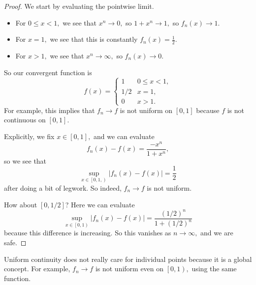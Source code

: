 \begin{proof}
	We start by evaluating the pointwise limit.
	\begin{itemize}
		\item For $0\le x<1,$ we see that $x^n\to0,$ so $1+x^n\to1,$ so $f_n(x)\to 1.$
		\item For $x=1,$ we see that this is constantly $f_n(x)=\frac12.$
		\item For $x>1,$ we see that $x^n\to\infty,$ so $f_n(x)\to0.$
	\end{itemize}
	So our convergent function is
	\[f(x)=\begin{cases}
		1 & 0\le x<1, \\
		1/2 & x=1, \\
		0 & x>1.
	\end{cases}\]
	For example, this implies that $f_n\to f$ is not uniform on $[0,1]$ because $f$ is not continuous on $[0,1].$

	Explicitly, we fix $x\in\left[0,1\right],$ and we can evaluate
	\[f_n(x)-f(x)=\frac{-x^n}{1+x^n},\]
	so we see that
	\[\sup_{x\in\left[0,1,\right)}\left|f_n(x)-f(x)\right|=\frac12\]
	after doing a bit of legwork. So indeed, $f_n\to f$ is not uniform.

	How about $[0,1/2]$? Here we can evaluate
	\[\sup_{x\in\left[0,1\right)}|f_n(x)-f(x)|=\frac{(1/2)^n}{1+(1/2)^n}\]
	because this difference is increasing. So this vanishes as $n\to\infty,$ and we are safe.
\end{proof}
\begin{remark}
	Uniform continuity does not really care for individual points because it is a global concept. For example, $f_n\to f$ is not uniform even on $\left[0,1\right),$ using the same function.
\end{remark}


